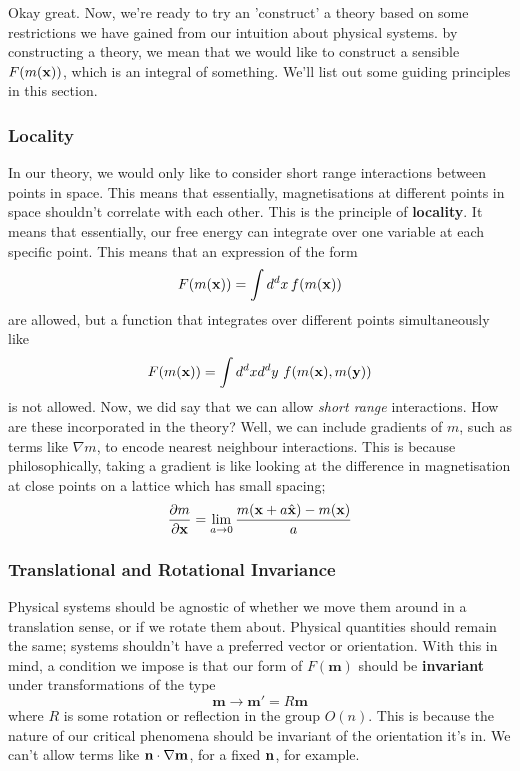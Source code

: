 Okay great. Now, we're ready to try an 'construct' a theory based on some restrictions we have gained from our intuition about physical systems. by constructing a theory, we mean that we would like to construct a sensible $F ( m ( \mathbf{x } ) ) $, which is an integral of something.  We'll list out some guiding principles in this section. 

\subsubsection*{Locality} 
In our theory, we would only like to consider short range interactions between points in space. This means that essentially, magnetisations at different points in space shouldn't correlate with each other. This is the principle of \textbf{locality}. It means that essentially, our free energy can integrate over one variable at each specific point. This means that an expression of the form 
\[ 
F ( m ( \mathbf{x})) = \int d^d x \,   f( m ( \mathbf{ x} )) 
\] are  allowed, but a function that integrates over different points simultaneously like 
\[ 
F( m ( \mathbf{x}) ) = \int d^d x d^d y  \, \, f ( m ( \mathbf{ x} ), m ( \mathbf{ y} ) ) 
\] is not allowed. Now, we did say that we can allow \textit{short range} interactions. How are these incorporated in the theory? Well, we can include gradients of $m  $, such as terms like $ \nabla m$, to encode nearest neighbour interactions. This is because philosophically, taking a gradient is like looking at the difference in magnetisation at close points on a lattice which has small spacing; 
\[ 
\frac{ \partial  m  }{ \partial  \mathbf{ x}  }  = \lim_{ a \rightarrow 0 } \frac{ m ( \mathbf{ x} + a \hat{ \mathbf{ x} })  - m ( \mathbf{ x} )  }{ a } 
\] 

\subsubsection*{Translational and Rotational Invariance} 
Physical systems should be agnostic of whether we move them around in a translation sense, or if we rotate them about. Physical quantities should remain the same; systems shouldn't have a preferred vector or orientation. With this in mind, a condition we impose is that our form of $F(\mathbf{m})$ should be \textbf{invariant} under transformations of the type 
\[
\mathbf{m} \rightarrow \mathbf{m}' = R \mathbf{m} 
\] where $R$ is some rotation or reflection in the group $O(n)$. This is because the nature of our critical phenomena should be invariant of the orientation it's in. We can't allow terms like $ \mathbf{ n} \cdot \nabla \mathbf{ m } $, for a fixed $\mathbf{ n} $, for example. 

